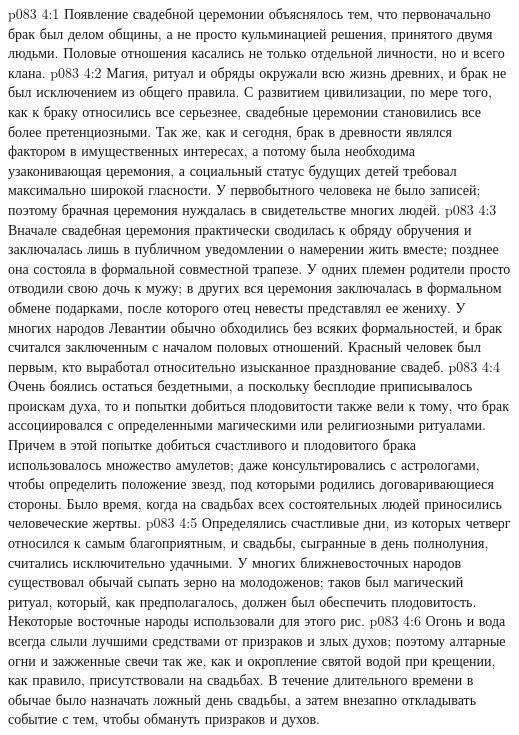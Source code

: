 \vs p083 4:1 Появление свадебной церемонии объяснялось тем, что первоначально брак был делом общины, а не просто кульминацией решения, принятого двумя людьми. Половые отношения касались не только отдельной личности, но и всего клана.
\vs p083 4:2 \pc Магия, ритуал и обряды окружали всю жизнь древних, и брак не был исключением из общего правила. С развитием цивилизации, по мере того, как к браку относились все серьезнее, свадебные церемонии становились все более претенциозными. Так же, как и сегодня, брак в древности являлся фактором в имущественных интересах, а потому была необходима узаконивающая церемония, а социальный статус будущих детей требовал максимально широкой гласности. У первобытного человека не было записей; поэтому брачная церемония нуждалась в свидетельстве многих людей.
\vs p083 4:3 Вначале свадебная церемония практически сводилась к обряду обручения и заключалась лишь в публичном уведомлении о намерении жить вместе; позднее она состояла в формальной совместной трапезе. У одних племен родители просто отводили свою дочь к мужу; в других вся церемония заключалась в формальном обмене подарками, после которого отец невесты представлял ее жениху. У многих народов Левантии обычно обходились без всяких формальностей, и брак считался заключенным с началом половых отношений. Красный человек был первым, кто выработал относительно изысканное празднование свадеб.
\vs p083 4:4 \pc Очень боялись остаться бездетными, а поскольку бесплодие приписывалось проискам духа, то и попытки добиться плодовитости также вели к тому, что брак ассоциировался с определенными магическими или религиозными ритуалами. Причем в этой попытке добиться счастливого и плодовитого брака использовалось множество амулетов; даже консультировались с астрологами, чтобы определить положение звезд, под которыми родились договаривающиеся стороны. Было время, когда на свадьбах всех состоятельных людей приносились человеческие жертвы.
\vs p083 4:5 Определялись счастливые дни, из которых четверг относился к самым благоприятным, и свадьбы, сыгранные в день полнолуния, считались исключительно удачными. У многих ближневосточных народов существовал обычай сыпать зерно на молодоженов; таков был магический ритуал, который, как предполагалось, должен был обеспечить плодовитость. Некоторые восточные народы использовали для этого рис.
\vs p083 4:6 Огонь и вода всегда слыли лучшими средствами от призраков и злых духов; поэтому алтарные огни и зажженные свечи так же, как и окропление святой водой при крещении, как правило, присутствовали на свадьбах. В течение длительного времени в обычае было назначать ложный день свадьбы, а затем внезапно откладывать событие с тем, чтобы обмануть призраков и духов.
